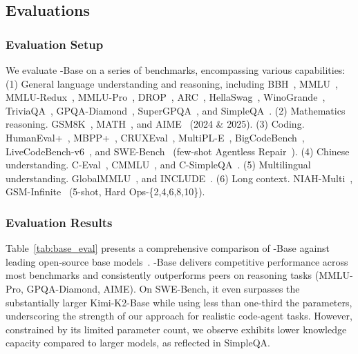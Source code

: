 \subsection{Evaluations}
\subsubsection{Evaluation Setup}
We evaluate \mimoflash{}-Base on a series of benchmarks, encompassing various capabilities: (1) General language understanding and reasoning, including BBH~\citep{suzgun2022challenging}, MMLU~\citep{hendrycks2020measuring}, MMLU-Redux~\citep{gema2024we}, MMLU-Pro~\citep{wang2024mmlu}, DROP~\citep{dua2019drop}, ARC~\citep{clark2018think}, HellaSwag~\citep{zellers2019hellaswag}, WinoGrande~\citep{sakaguchi2021winogrande}, TriviaQA~\citep{joshi2017triviaqa}, GPQA-Diamond~\citep{rein2024gpqa}, SuperGPQA~\citep{du2025supergpqa}, and SimpleQA~\citep{simpleqa}.
(2) Mathematics reasoning.
GSM8K~\citep{cobbe2021training}, MATH~\citep{hendrycks2021measuring}, and  AIME~\citep{AIME} (2024 \& 2025). 
(3) Coding. HumanEval+~\citep{liu2023your}, MBPP+~\citep{liu2023your}, CRUXEval~\citep{gu2024cruxeval}, MultiPL-E~\citep{cassano2022multipl}, BigCodeBench~\citep{zhuo2024bigcodebench}, LiveCodeBench-v6~\citep{jain2024livecodebench}, and SWE-Bench~\citep{jimenez2023swe} (few-shot Agentless Repair~\citep{xia2024agentless}).
(4) Chinese understanding. C-Eval~\citep{huang2023c}, CMMLU~\citep{li2023cmmlu}, and C-SimpleQA~\citep{he2025chinese}.
(5) Multilingual understanding. GlobalMMLU~\citep{singh2025global}, and INCLUDE~\citep{romanou2024include}.
(6) Long context. NIAH-Multi~\citep{hsieh2024ruler}, GSM-Infinite~\citep{zhou2025gsm} (5-shot, Hard Ops-\{2,4,6,8,10\}).


\subsubsection{Evaluation Results}



Table~\ref{tab:base_eval} presents a comprehensive comparison of \mimoflash{}-Base against leading open-source base models~\citep{team2025kimik2,liu2024deepseek}.
\mimoflash{}-Base delivers competitive performance across most benchmarks and consistently outperforms peers on reasoning tasks (MMLU-Pro, GPQA-Diamond, AIME).
On SWE-Bench, it even surpasses the substantially larger Kimi-K2-Base while using less than one-third the parameters, underscoring the strength of our approach for realistic code-agent tasks. 
However, constrained by its limited parameter count, we observe \mimoflash{} exhibits lower knowledge capacity compared to larger models, as reflected in SimpleQA.



